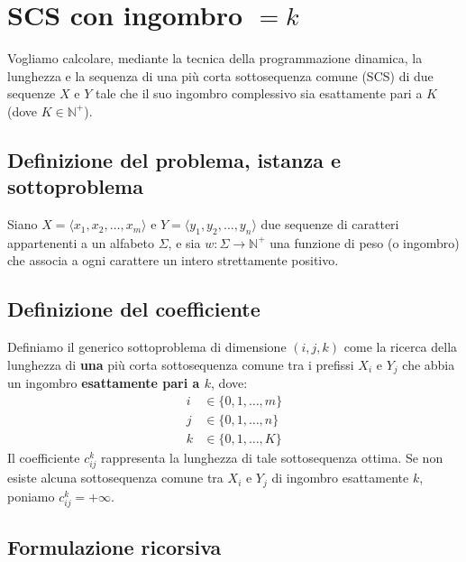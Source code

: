 \chapter{SCS con ingombro $=k$}

Vogliamo calcolare, mediante la tecnica della programmazione dinamica, la lunghezza e la sequenza di una più corta sottosequenza comune (SCS) di due sequenze $X$ e $Y$ tale che il suo ingombro complessivo sia esattamente pari a $K$ (dove $K \in \mathbb{N}^+$).

\section{Definizione del problema, istanza e sottoproblema}
Siano $X = \langle x_1, x_2, \dots, x_m \rangle$ e $Y = \langle y_1, y_2, \dots, y_n \rangle$ due sequenze di caratteri appartenenti a un alfabeto $\Sigma$, e sia $w: \Sigma \to \mathbb{N}^+$ una funzione di peso (o ingombro) che associa a ogni carattere un intero strettamente positivo.

\section{Definizione del coefficiente}
Definiamo il generico sottoproblema di dimensione $(i, j, k)$ come la ricerca della lunghezza di \textbf{una} più corta sottosequenza comune tra i prefissi $X_i$ e $Y_j$ che abbia un ingombro \textbf{esattamente pari a $k$}, dove:
\begin{align*}
    i &\in \{0, 1, \dots, m\} \\
    j &\in \{0, 1, \dots, n\} \\
    k &\in \{0, 1, \dots, K\}
\end{align*}
Il coefficiente $c_{ij}^k$ rappresenta la lunghezza di tale sottosequenza ottima. Se non esiste alcuna sottosequenza comune tra $X_i$ e $Y_j$ di ingombro esattamente $k$, poniamo $c_{ij}^k = +\infty$.

\section{Formulazione ricorsiva}

